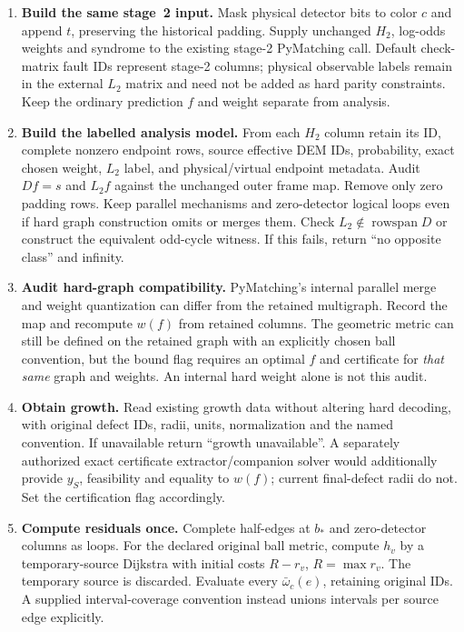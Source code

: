 \begin{enumerate}
Keep the exact column ordering and hard merge/tie policy.
\item \textbf{Build the same stage~2 input.} Mask physical detector bits
to color $c$ and append $t$, preserving the historical padding. Supply
unchanged $H_2$, log-odds weights and syndrome to the existing stage-2
PyMatching call. Default check-matrix fault IDs represent stage-2 columns;
physical observable labels remain in the external $L_2$ matrix and need
not be added as hard parity constraints. Keep the ordinary prediction
$f$ and weight separate from analysis.
\item \textbf{Build the labelled analysis model.} From each $H_2$ column
retain its ID, complete nonzero endpoint rows, source effective DEM IDs,
probability, exact chosen weight, $L_2$ label, and physical/virtual endpoint
metadata. Audit $D f=s$ and $L_2f$ against the unchanged outer frame map.
Remove only zero padding rows. Keep parallel mechanisms and zero-detector
logical loops even if hard graph construction omits or merges them. Check
$L_2\notin\operatorname{rowspan}D$ or construct the equivalent odd-cycle
witness. If this fails, return ``no opposite class'' and infinity.
\item \textbf{Audit hard-graph compatibility.} PyMatching's internal parallel
merge and weight quantization can differ from the retained multigraph.
Record the map and recompute $w(f)$ from retained columns. The geometric
metric can still be defined on the retained graph with an explicitly
chosen ball convention, but the bound flag requires an optimal $f$ and
certificate for \emph{that same} graph and weights. An internal hard weight
alone is not this audit.
\item \textbf{Obtain growth.} Read existing growth data without altering
hard decoding, with original defect IDs, radii, units, normalization and
the named convention. If unavailable return ``growth unavailable''.
A separately authorized exact certificate extractor/companion solver
would additionally provide $y_S$, feasibility and equality to $w(f)$;
current final-defect radii do not. Set the certification flag accordingly.
\item \textbf{Compute residuals once.} Complete half-edges at $b_*$ and
zero-detector columns as loops. For the declared original ball metric,
compute $h_v$ by a temporary-source Dijkstra with initial costs
$R-r_v$, $R=\max r_v$. The temporary source is discarded. Evaluate every
$\bar\omega_c(e)$, retaining original IDs. A supplied interval-coverage
convention instead unions intervals per source edge explicitly.

\end{enumerate}
